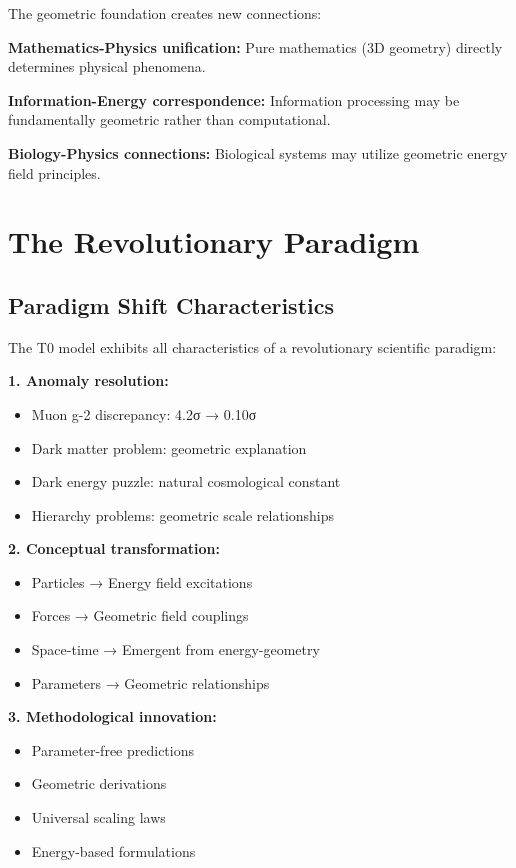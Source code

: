 \documentclass[12pt,a4paper]{report}
\begin{document}
The geometric foundation creates new connections:

\textbf{Mathematics-Physics unification:}
Pure mathematics (3D geometry) directly determines physical phenomena.

\textbf{Information-Energy correspondence:}
Information processing may be fundamentally geometric rather than computational.

\textbf{Biology-Physics connections:}
Biological systems may utilize geometric energy field principles.

\section{The Revolutionary Paradigm}
\label{sec:revolutionary_paradigm}

\subsection{Paradigm Shift Characteristics}
\label{subsec:paradigm_shift_characteristics}

The T0 model exhibits all characteristics of a revolutionary scientific paradigm:

\textbf{1. Anomaly resolution:}
\begin{itemize}
	\item Muon g-2 discrepancy: 4.2σ → 0.10σ
	\item Dark matter problem: geometric explanation
	\item Dark energy puzzle: natural cosmological constant
	\item Hierarchy problems: geometric scale relationships
\end{itemize}

\textbf{2. Conceptual transformation:}
\begin{itemize}
	\item Particles → Energy field excitations
	\item Forces → Geometric field couplings
	\item Space-time → Emergent from energy-geometry
	\item Parameters → Geometric relationships
\end{itemize}

\textbf{3. Methodological innovation:}
\begin{itemize}
	\item Parameter-free predictions
	\item Geometric derivations
	\item Universal scaling laws
	\item Energy-based formulations
\end{itemize}
\end{document}
